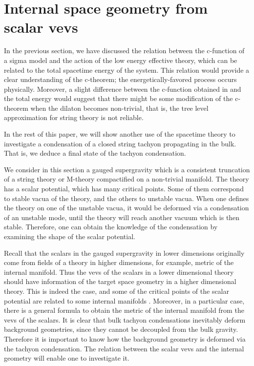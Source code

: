 \documentclass[a4paper,a4paper]{article}
\begin{document}
\vspace{1cm}

\section{Internal space geometry from scalar vevs}  \label{potential}

\vspace{5mm}

In the previous section, we have discussed the relation between the c-function of a sigma model and the action of 
the low energy effective theory, which can be related to the total spacetime energy of the system. 
This relation would provide a clear understanding of the c-theorem; the energetically-favored process occurs 
physically. 
Moreover, a slight difference between the c-function obtained in \cite{Tseytlin} and the total energy would 
suggest that there might be some modification of the c-theorem when the dilaton becomes non-trivial, that is, 
the tree level approximation for string theory is not reliable. 

In the rest of this paper, we will show another use of the spacetime theory to investigate a condensation of a 
closed string tachyon propagating in the bulk. 
That is, we deduce a final state of the tachyon condensation. 

\vspace{3mm}

We consider in this section a gauged supergravity which is a consistent truncation of a string theory or 
M-theory compactified on a non-trivial manifold. 
The theory has a scalar potential, which has many critical points. 
Some of them correspond to stable vacua of the theory, and the others to unstable vacua. 
When one defines the theory on one of the unstable vacua, it would be deformed via a condensation of an unstable 
mode, until the theory will reach another vacuum which is then stable. 
Therefore, one can obtain the knowledge of the condensation by examining the shape of the scalar potential. 

Recall that the scalars in the gauged supergravity in lower dimensions originally come from fields of a theory in 
higher dimensions, 
for example, metric of the internal manifold. 
Thus the vevs of the scalars in a lower dimensional theory should have information of the target space geometry in 
a higher dimensional theory. 
This is indeed the case, and some of the critical points of the scalar potential are related to some internal 
manifolds \cite{AdS/CFT}. 
Moreover, in a particular case, there is a general formula \cite{embedding} to obtain the metric of the internal 
manifold from the vevs of the scalars. 
It is clear that bulk tachyon condensations inevitably deform background geometries, since they cannot be 
decoupled from the bulk gravity. 
Therefore it is important to know how the background geometry is deformed via the tachyon condensation. 
The relation between the scalar vevs and the internal geometry will enable one to investigate it. 
\end{document}
